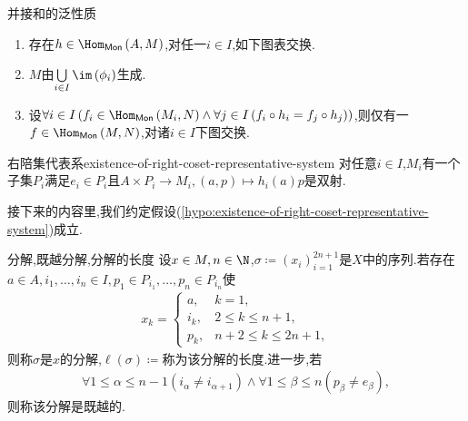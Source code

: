 \begin{proposition}{并接和的泛性质}{}
	\begin{enumerate}
		\item 存在$h\in\Hom_{\mathsf{Mon}}\left(A,M\right)$,对任一$i\in I$,如下图表交换.
		\begin{center}
		\end{center}
		\item $M$由$\bigcup\limits_{i\in I}\im\left(\phi_{i}\right)$生成.
		\item 设$\forall i\in I\left(f_{i}\in\Hom_{\mathsf{Mon}}\left(M_{i},N\right)\wedge\forall j\in I\left(f_{i}\circ h_{i}=f_{j}\circ h_{j}\right)\right)$,则仅有一$f\in\Hom_{\mathsf{Mon}}\left(M,N\right)$,对诸$i\in I$下图交换.
		\begin{center}
		\end{center}
	\end{enumerate}
\end{proposition}

\begin{hypothesis}{右陪集代表系}{existence-of-right-coset-representative-system}
	对任意$i\in I$,$M_{i}$有一个子集$P_{i}$满足$e_{i}\in P_{i}$且$A\times P_{i}\to M_{i},\left(a,p\right)\mapsto h_{i}\left(a\right)p$是双射.
\end{hypothesis}

接下来的内容里,我们约定假设(\cref{hypo:existence-of-right-coset-representative-system})成立.

\begin{definition}{分解,既越分解,分解的长度}{}
	设$x\in M,n\in\N$,$\sigma\coloneq\left(x_{i}\right)_{i=1}^{2n+1}$是$X$中的序列.若存在$a\in A,i_{1},\ldots,i_{n}\in I,p_{1}\in P_{i_{1}},\ldots,p_{n}\in P_{i_{n}}$使
	\begin{align}
		x_{k}=
		\begin{cases}
			a,&k=1,\\
			i_{k},&2\leq k\leq n+1,\\
			p_{k},&n+2\leq k\leq 2n+1,
		\end{cases}
	\end{align}
	则称$\sigma$是$x$的分解,$\ell\left(\sigma\right)\coloneq$称为该分解的长度.进一步,若
	\begin{align*}
		\forall 1\leq\alpha\leq n-1\left(i_{\alpha}\neq i_{\alpha+1}\right)\wedge\forall 1\leq\beta\leq n\left(p_{\beta}\neq e_{\beta}\right),
	\end{align*}
	则称该分解是既越的.
\end{definition}

